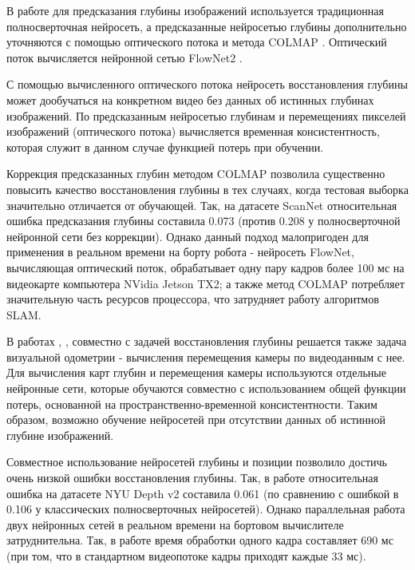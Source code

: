 \documentclass{mipt-thesis-ms}
\begin{document}
	В работе \cite{luo2020consistent} для предсказания глубины изображений используется традиционная полносверточная нейросеть, а предсказанные нейросетью глубины дополнительно уточняются с помощью оптического потока и метода COLMAP \cite{schonberger2016structure}. Оптический поток вычисляется нейронной сетью FlowNet2 \cite{ilg2017flownet}.
	
	С помощью вычисленного оптического потока нейросеть восстановления глубины может дообучаться на конкретном видео без данных об истинных глубинах изображений. По предсказанным нейросетью глубинам и перемещениях пикселей изображений (оптического потока) вычисляется временная консистентность, которая служит в данном случае функцией потерь при обучении.
	
	Коррекция предсказанных глубин методом COLMAP позволила существенно повысить качество восстановления глубины в тех случаях, когда тестовая выборка значительно отличается от обучающей. Так, на датасете ScanNet \cite{dai2017scannet} относительная ошибка предсказания глубины составила 0.073 (против 0.208 у полносверточной нейронной сети без коррекции). Однако данный подход малопригоден для применения в реальном времени на борту робота - нейросеть FlowNet, вычисляющая оптический поток, обрабатывает одну пару кадров более 100 мс на видеокарте компьютера NVidia Jetson TX2; а также метод COLMAP потребляет значительную часть ресурсов процессора, что затрудняет работу алгоритмов SLAM.
	
	В работах \cite{zhou2017unsupervised}, \cite{yang2020d3vo}, \cite{teed2018deepv2d} совместно с задачей восстановления глубины решается также задача визуальной одометрии - вычисления перемещения камеры по видеоданным с нее. Для вычисления карт глубин и перемещения камеры используются отдельные нейронные сети, которые обучаются совместно с использованием общей функции потерь, основанной на пространственно-временной консистентности. Таким образом, возможно обучение нейросетей при отсутствии данных об истинной глубине изображений.
	
	Совместное использование нейросетей глубины и позиции позволило достичь очень низкой ошибки восстановления глубины. Так, в работе \cite{teed2018deepv2d} относительная ошибка на датасете NYU Depth v2 \cite{silberman2012indoor} составила 0.061 (по сравнению с ошибкой в 0.106 у классических полносверточных нейросетей). Однако параллельная работа двух нейронных сетей в реальном времени на бортовом вычислителе затруднительна. Так, в работе \cite{teed2018deepv2d} время обработки одного кадра составляет 690 мс (при том, что в стандартном видеопотоке кадры приходят каждые 33 мс).
	
\end{document}
